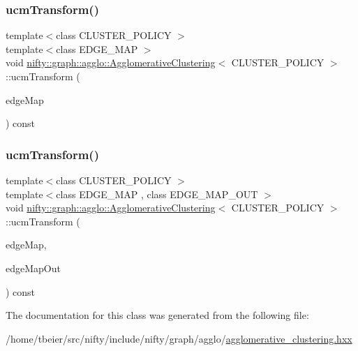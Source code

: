 \subsubsection{\texorpdfstring{ucm\+Transform()}{ucmTransform()}\hspace{0.1cm}{\footnotesize\ttfamily [1/2]}}
{\footnotesize\ttfamily template$<$class C\+L\+U\+S\+T\+E\+R\+\_\+\+P\+O\+L\+I\+CY $>$ \\
template$<$class E\+D\+G\+E\+\_\+\+M\+AP $>$ \\
void \hyperlink{classnifty_1_1graph_1_1agglo_1_1AgglomerativeClustering}{nifty\+::graph\+::agglo\+::\+Agglomerative\+Clustering}$<$ C\+L\+U\+S\+T\+E\+R\+\_\+\+P\+O\+L\+I\+CY $>$\+::ucm\+Transform (\begin{DoxyParamCaption}\item[{E\+D\+G\+E\+\_\+\+M\+AP \&}]{edge\+Map }\end{DoxyParamCaption}) const\hspace{0.3cm}{\ttfamily [inline]}}

\mbox{\label{classnifty_1_1graph_1_1agglo_1_1AgglomerativeClustering_a717660885100f4c0321c4e19fb536072}} 
\subsubsection{\texorpdfstring{ucm\+Transform()}{ucmTransform()}\hspace{0.1cm}{\footnotesize\ttfamily [2/2]}}
{\footnotesize\ttfamily template$<$class C\+L\+U\+S\+T\+E\+R\+\_\+\+P\+O\+L\+I\+CY $>$ \\
template$<$class E\+D\+G\+E\+\_\+\+M\+AP , class E\+D\+G\+E\+\_\+\+M\+A\+P\+\_\+\+O\+UT $>$ \\
void \hyperlink{classnifty_1_1graph_1_1agglo_1_1AgglomerativeClustering}{nifty\+::graph\+::agglo\+::\+Agglomerative\+Clustering}$<$ C\+L\+U\+S\+T\+E\+R\+\_\+\+P\+O\+L\+I\+CY $>$\+::ucm\+Transform (\begin{DoxyParamCaption}\item[{const E\+D\+G\+E\+\_\+\+M\+AP \&}]{edge\+Map,  }\item[{E\+D\+G\+E\+\_\+\+M\+A\+P\+\_\+\+O\+UT \&}]{edge\+Map\+Out }\end{DoxyParamCaption}) const\hspace{0.3cm}{\ttfamily [inline]}}



The documentation for this class was generated from the following file\+:\begin{DoxyCompactItemize}
\item 
/home/tbeier/src/nifty/include/nifty/graph/agglo/\hyperlink{agglomerative__clustering_8hxx}{agglomerative\+\_\+clustering.\+hxx}\end{DoxyCompactItemize}

